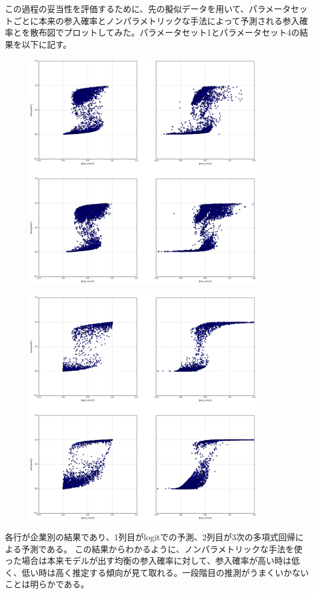\documentclass{jsarticle}
\begin{document}
この過程の妥当性を評価するために、先の擬似データを用いて、パラメータセットごとに本来の参入確率とノンパラメトリックな手法によって予測される参入確率とを散布図でプロットしてみた。パラメータセット1とパラメータセット4の結果を以下に記す。
\begin{figure}[h]
    \centering
    \includegraphics[width=10cm]{entryprobs_scatter_param1.png}
\end{figure}


\begin{figure}[h]
    \centering
    \includegraphics[width=10cm]{entryprobs_scatter_param4.png}
\end{figure}

各行が企業別の結果であり、1列目がlogitでの予測、2列目が3次の多項式回帰による予測である。
この結果からわかるように、ノンパラメトリックな手法を使った場合は本来モデルが出す均衡の参入確率に対して、参入確率が高い時は低く、低い時は高く推定する傾向が見て取れる。一段階目の推測がうまくいかないことは明らかである。
\end{document}
